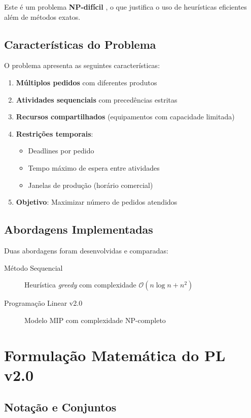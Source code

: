 \documentclass[12pt,a4paper]{article}
\theoremstyle{definition}
\newcommand{\BigO}{\mathcal{O}}
\begin{document}
Este é um problema \textbf{NP-difícil} \cite{Pinedo2016}, o que justifica o uso de heurísticas eficientes além de métodos exatos.

\subsection{Características do Problema}

O problema apresenta as seguintes características:

\begin{enumerate}
    \item \textbf{Múltiplos pedidos} com diferentes produtos
    \item \textbf{Atividades sequenciais} com precedências estritas
    \item \textbf{Recursos compartilhados} (equipamentos com capacidade limitada)
    \item \textbf{Restrições temporais}:
    \begin{itemize}
        \item Deadlines por pedido
        \item Tempo máximo de espera entre atividades
        \item Janelas de produção (horário comercial)
    \end{itemize}
    \item \textbf{Objetivo}: Maximizar número de pedidos atendidos
\end{enumerate}

\subsection{Abordagens Implementadas}

Duas abordagens foram desenvolvidas e comparadas:

\begin{description}
    \item[Método Sequencial] Heurística \textit{greedy} com complexidade $\BigO(n \log n + n^2)$
    \item[Programação Linear v2.0] Modelo MIP com complexidade NP-completo
\end{description}

\section{Formulação Matemática do PL v2.0}

\subsection{Notação e Conjuntos}
\end{document}
